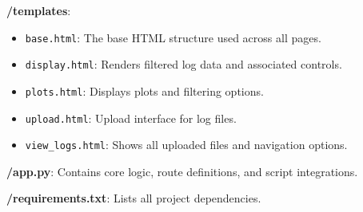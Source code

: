 \documentclass{article}
\begin{document}
\textbf{/templates}:
\begin{itemize}
    \item \texttt{base.html}: The base HTML structure used across all pages.
    \item \texttt{display.html}: Renders filtered log data and associated controls.
    \item \texttt{plots.html}: Displays plots and filtering options.
    \item \texttt{upload.html}: Upload interface for log files.
    \item \texttt{view\_logs.html}: Shows all uploaded files and navigation options.
\end{itemize}

\textbf{/app.py}: Contains core logic, route definitions, and script integrations.

\textbf{/requirements.txt}: Lists all project dependencies.
\end{document}
